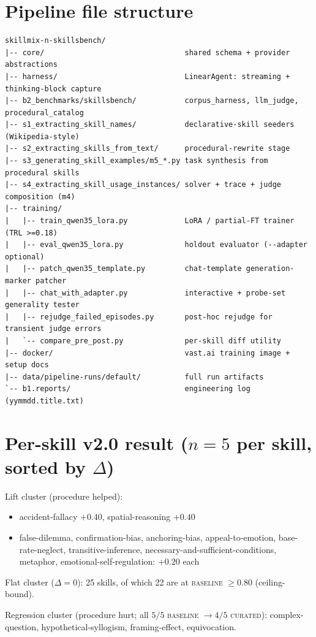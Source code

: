 \documentclass[10pt]{article}
\newcommand{\BL}{\textsc{baseline}\xspace}
\newcommand{\CU}{\textsc{curated}\xspace}
\begin{document}
\section{Pipeline file structure}\label{app:pipeline}
{\small
\begin{verbatim}
skillmix-n-skillsbench/
|-- core/                                shared schema + provider abstractions
|-- harness/                             LinearAgent: streaming + thinking-block capture
|-- b2_benchmarks/skillsbench/           corpus_harness, llm_judge, procedural_catalog
|-- s1_extracting_skill_names/           declarative-skill seeders (Wikipedia-style)
|-- s2_extracting_skills_from_text/      procedural-rewrite stage
|-- s3_generating_skill_examples/m5_*.py task synthesis from procedural skills
|-- s4_extracting_skill_usage_instances/ solver + trace + judge composition (m4)
|-- training/
|   |-- train_qwen35_lora.py             LoRA / partial-FT trainer (TRL >=0.18)
|   |-- eval_qwen35_lora.py              holdout evaluator (--adapter optional)
|   |-- patch_qwen35_template.py         chat-template generation-marker patcher
|   |-- chat_with_adapter.py             interactive + probe-set generality tester
|   |-- rejudge_failed_episodes.py       post-hoc rejudge for transient judge errors
|   `-- compare_pre_post.py              per-skill diff utility
|-- docker/                              vast.ai training image + setup docs
|-- data/pipeline-runs/default/          full run artifacts
`-- b1.reports/                          engineering log (yymmdd.title.txt)
\end{verbatim}
}

\section{Per-skill v2.0 result ($n{=}5$ per skill, sorted by $\Delta$)}\label{app:per-skill}
Lift cluster (procedure helped):
\begin{itemize}[leftmargin=*,nosep]
  \item accident-fallacy $+0.40$, spatial-reasoning $+0.40$
  \item false-dilemma, confirmation-bias, anchoring-bias, appeal-to-emotion, base-rate-neglect, transitive-inference, necessary-and-sufficient-conditions, metaphor, emotional-self-regulation: $+0.20$ each
\end{itemize}
Flat cluster ($\Delta = 0$): 25 skills, of which 22 are at \BL{} $\geq 0.80$ (ceiling-bound).

Regression cluster (procedure hurt; all $5/5$ \BL{} $\to 4/5$ \CU): complex-question, hypothetical-syllogism, framing-effect, equivocation.
\end{document}
